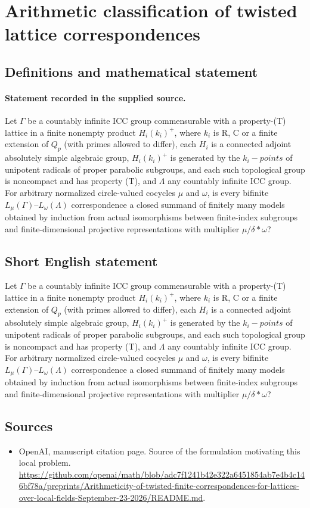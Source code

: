 \documentclass[11pt]{article}
\begin{document}
\section*{Arithmetic classification of twisted lattice correspondences}\label{statement}
\subsection{Definitions and mathematical statement}
\paragraph{Statement recorded in the supplied source.}
Let $\Gamma $ be a countably infinite ICC group commensurable with a property-(T) lattice in a finite nonempty product $H_i(k_i)^+$, where $k_i$ is R, C or a finite extension of $Q_p$ (with primes allowed to differ), each $H_i$ is a connected adjoint absolutely simple algebraic group, $H_i(k_i)^+$ is generated by the $k_i-points$ of unipotent radicals of proper parabolic subgroups, and each such topological group is noncompact and has property (T), and $\Lambda $ any countably infinite ICC group. For arbitrary normalized circle-valued cocycles $\mu $ and $\omega $, is every bifinite $L_\mu (\Gamma )–L_\omega (\Lambda )$ correspondence a closed summand of finitely many models obtained by induction from actual isomorphisms between finite-index subgroups and finite-dimensional projective representations with multiplier $\mu /\delta *\omega $?
\subsection{Short English statement}
Let $\Gamma $ be a countably infinite ICC group commensurable with a property-(T) lattice in a finite nonempty product $H_i(k_i)^+$, where $k_i$ is R, C or a finite extension of $Q_p$ (with primes allowed to differ), each $H_i$ is a connected adjoint absolutely simple algebraic group, $H_i(k_i)^+$ is generated by the $k_i-points$ of unipotent radicals of proper parabolic subgroups, and each such topological group is noncompact and has property (T), and $\Lambda $ any countably infinite ICC group. For arbitrary normalized circle-valued cocycles $\mu $ and $\omega $, is every bifinite $L_\mu (\Gamma )–L_\omega (\Lambda )$ correspondence a closed summand of finitely many models obtained by induction from actual isomorphisms between finite-index subgroups and finite-dimensional projective representations with multiplier $\mu /\delta *\omega $?
\subsection{Sources}
\begin{itemize}
\item[S1] OpenAI, manuscript citation page. Source of the formulation motivating this local problem.
\url{https://github.com/openai/math/blob/adc7f1241b42e322a6451854ab7e4b4c146bf78a/preprints/Arithmeticity-of-twisted-finite-correspondences-for-lattices-over-local-fields-September-23-2026/README.md}.
\end{itemize}
\end{document}
